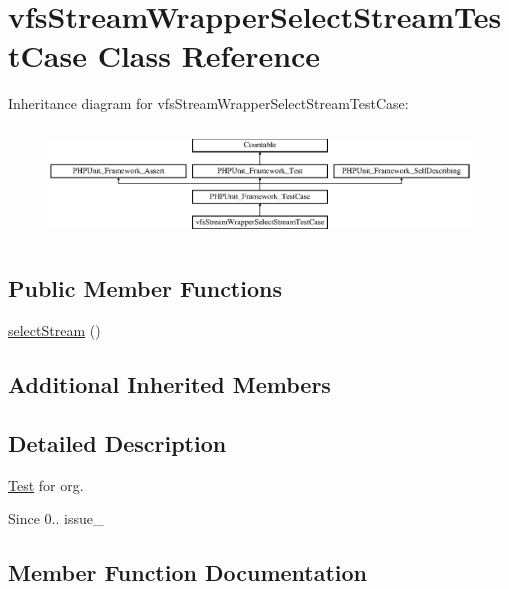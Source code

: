 \hypertarget{classorg_1_1bovigo_1_1vfs_1_1vfs_stream_wrapper_select_stream_test_case}{}\section{vfs\+Stream\+Wrapper\+Select\+Stream\+Test\+Case Class Reference}
\label{classorg_1_1bovigo_1_1vfs_1_1vfs_stream_wrapper_select_stream_test_case}
Inheritance diagram for vfs\+Stream\+Wrapper\+Select\+Stream\+Test\+Case\+:\begin{figure}[H]
\begin{center}
\leavevmode
\includegraphics[height=2.974767cm]{classorg_1_1bovigo_1_1vfs_1_1vfs_stream_wrapper_select_stream_test_case}
\end{center}
\end{figure}
\subsection*{Public Member Functions}
\begin{DoxyCompactItemize}
\item 
\mbox{\hyperlink{classorg_1_1bovigo_1_1vfs_1_1vfs_stream_wrapper_select_stream_test_case_a0e24475ef04fc8654279d7c57410f6a9}{select\+Stream}} ()
\end{DoxyCompactItemize}
\subsection*{Additional Inherited Members}


\subsection{Detailed Description}
\mbox{\hyperlink{class_test}{Test}} for org.

\begin{DoxySince}{Since}
0..  issue\+\_ 
\end{DoxySince}


\subsection{Member Function Documentation}
\mbox{\label{classorg_1_1bovigo_1_1vfs_1_1vfs_stream_wrapper_select_stream_test_case_a0e24475ef04fc8654279d7c57410f6a9}} 

